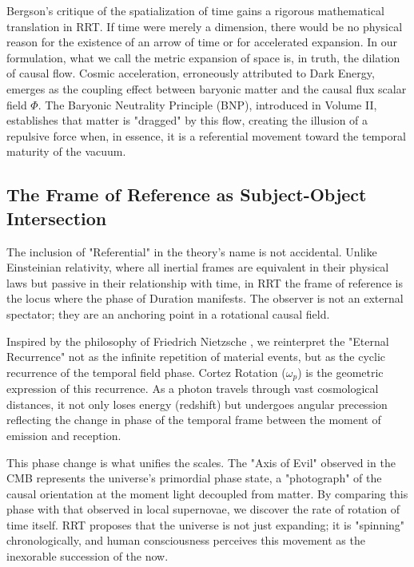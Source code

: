 \documentclass[12pt, a4paper]{article}
\begin{document}
Bergson's critique of the spatialization of time gains a rigorous mathematical translation in RRT. If time were merely a dimension, there would be no physical reason for the existence of an arrow of time or for accelerated expansion. In our formulation, what we call the metric expansion of space is, in truth, the dilation of causal flow. Cosmic acceleration, erroneously attributed to Dark Energy, emerges as the coupling effect between baryonic matter and the causal flux scalar field $\Phi$. The Baryonic Neutrality Principle (BNP), introduced in Volume II, establishes that matter is "dragged" by this flow, creating the illusion of a repulsive force when, in essence, it is a referential movement toward the temporal maturity of the vacuum.

\subsection{The Frame of Reference as Subject-Object Intersection}

The inclusion of "Referential" in the theory's name is not accidental. Unlike Einsteinian relativity, where all inertial frames are equivalent in their physical laws but passive in their relationship with time, in RRT the frame of reference is the locus where the phase of Duration manifests. The observer is not an external spectator; they are an anchoring point in a rotational causal field. 

Inspired by the philosophy of Friedrich Nietzsche \cite{Nietzsche1883}, we reinterpret the "Eternal Recurrence" not as the infinite repetition of material events, but as the cyclic recurrence of the temporal field phase. Cortez Rotation ($\omega_p$) is the geometric expression of this recurrence. As a photon travels through vast cosmological distances, it not only loses energy (redshift) but undergoes angular precession reflecting the change in phase of the temporal frame between the moment of emission and reception. 

This phase change is what unifies the scales. The "Axis of Evil" observed in the CMB represents the universe's primordial phase state, a "photograph" of the causal orientation at the moment light decoupled from matter. By comparing this phase with that observed in local supernovae, we discover the rate of rotation of time itself. RRT proposes that the universe is not just expanding; it is "spinning" chronologically, and human consciousness perceives this movement as the inexorable succession of the now.
\end{document}

